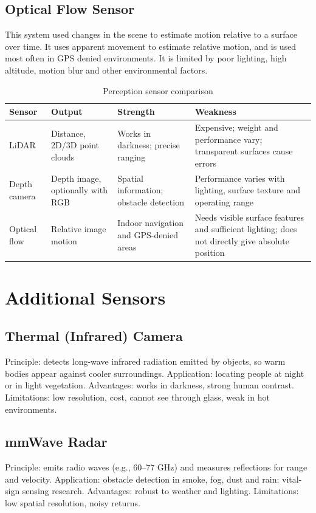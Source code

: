 \documentclass[conference]{IEEEtran}
\begin{document}
\subsection{Optical Flow Sensor}
This system used changes in the scene to estimate motion relative to a surface over time. It uses apparent movement to estimate relative motion, and is used most often in GPS denied environments. It is limited by poor lighting, high altitude, motion blur and other environmental factors.

\begin{table}[!t]
\centering
\footnotesize
\renewcommand{\arraystretch}{1.15}
\caption{Perception sensor comparison}
\label{tab:perception}
\begin{tabular}{@{}p{2.2cm}p{3.6cm}p{4.4cm}p{6.3cm}@{}}
\toprule
\textbf{Sensor} & \textbf{Output} & \textbf{Strength} & \textbf{Weakness}\\
\midrule
LiDAR & Distance, 2D/3D point clouds & Works in darkness; precise ranging & Expensive; weight and performance vary; transparent surfaces cause errors\\
Depth camera & Depth image, optionally with RGB & Spatial information; obstacle detection & Performance varies with lighting, surface texture and operating range\\
Optical flow & Relative image motion & Indoor navigation and GPS-denied areas & Needs visible surface features and sufficient lighting; does not directly give absolute position\\
\bottomrule
\end{tabular}
\end{table}
\section{Additional Sensors}

\subsection{Thermal (Infrared) Camera}
Principle: detects long-wave infrared radiation emitted by objects, so warm bodies appear against cooler surroundings. Application: locating people at night or in light vegetation. Advantages: works in darkness, strong human contrast. Limitations: low resolution, cost, cannot see through glass, weak in hot environments. \cite{thermal}
\subsection{mmWave Radar}
Principle: emits radio waves (e.g., 60--77 GHz) and measures reflections for range and velocity. Application: obstacle detection in smoke, fog, dust and rain; vital-sign sensing research. Advantages: robust to weather and lighting. Limitations: low spatial resolution, noisy returns.\cite{mmWave}
\end{document}

